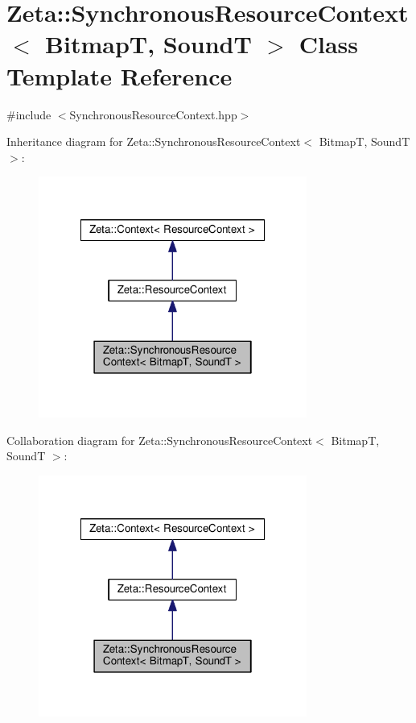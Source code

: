 \hypertarget{classZeta_1_1SynchronousResourceContext}{\section{Zeta\+:\+:Synchronous\+Resource\+Context$<$ Bitmap\+T, Sound\+T $>$ Class Template Reference}
\label{classZeta_1_1SynchronousResourceContext}
}


{\ttfamily \#include $<$Synchronous\+Resource\+Context.\+hpp$>$}



Inheritance diagram for Zeta\+:\+:Synchronous\+Resource\+Context$<$ Bitmap\+T, Sound\+T $>$\+:\nopagebreak
\begin{figure}[H]
\begin{center}
\leavevmode
\includegraphics[width=250pt]{classZeta_1_1SynchronousResourceContext__inherit__graph}
\end{center}
\end{figure}


Collaboration diagram for Zeta\+:\+:Synchronous\+Resource\+Context$<$ Bitmap\+T, Sound\+T $>$\+:\nopagebreak
\begin{figure}[H]
\begin{center}
\leavevmode
\includegraphics[width=250pt]{classZeta_1_1SynchronousResourceContext__coll__graph}
\end{center}
\end{figure}
